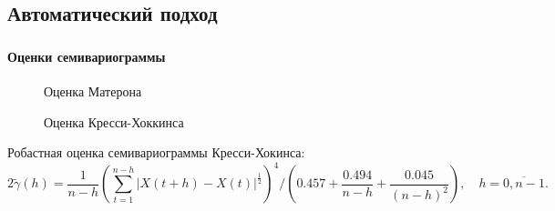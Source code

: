 \documentclass[notheorems]{beamer}
\theoremstyle{definition}
\theoremstyle{example}
\theoremstyle{plain}
\begin{document}
\subsection{Автоматический подход}

\begin{frame}
  \frametitle{\large\subsecname}
  \framesubtitle{Оценки семивариограммы}
  \begin{figure}[h]
    \begin{minipage}[h]{0.49\linewidth}
      \caption{Оценка Матерона}
    \end{minipage}
    \hfill
    \begin{minipage}[h]{0.49\linewidth}
      \caption{Оценка Кресси-Хоккинса}
    \end{minipage}
  \end{figure}
  Робастная оценка семивариограммы Кресси-Хокинса:
  \begin{equation}
  \label{eq:cressie}
    2 \tilde{\gamma}(h) = \frac{1}{n - h} (\sum_{t = 1}^{n - h} | X(t + h) - X(t) |^{\frac{1}{2}} )^4 / (0.457 + \frac{0.494}{n - h} + \frac{0.045}{(n - h)^2}), \quad h = \overline{0, n - 1}.
  \end{equation}
\end{frame}
\end{document}
